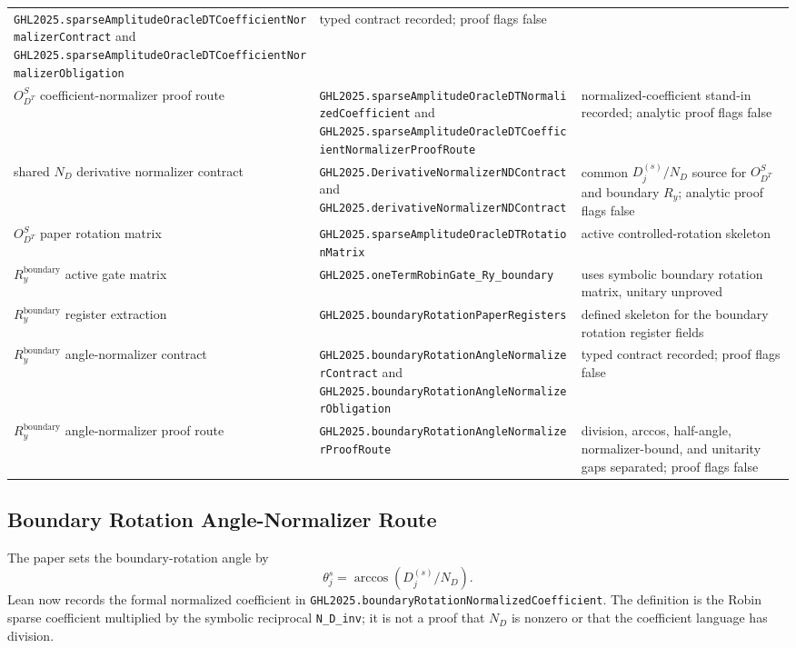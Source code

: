 \begin{center}
\begin{tabular}{lll}
\texttt{GHL2025.sparseAmplitudeOracleDTCoefficientNormalizerContract} and
\texttt{GHL2025.sparseAmplitudeOracleDTCoefficientNormalizerObligation} &
typed contract recorded; proof flags false \\
\(O_{D^T}^S\) coefficient-normalizer proof route &
\texttt{GHL2025.sparseAmplitudeOracleDTNormalizedCoefficient} and
\texttt{GHL2025.sparseAmplitudeOracleDTCoefficientNormalizerProofRoute} &
normalized-coefficient stand-in recorded; analytic proof flags false \\
shared \(N_D\) derivative normalizer contract &
\texttt{GHL2025.DerivativeNormalizerNDContract} and
\texttt{GHL2025.derivativeNormalizerNDContract} &
common \(D_j^{(s)}/N_D\) source for \(O_{D^T}^S\) and boundary \(R_y\);
analytic proof flags false \\
\(O_{D^T}^S\) paper rotation matrix &
\texttt{GHL2025.sparseAmplitudeOracleDTRotationMatrix} &
active controlled-rotation skeleton \\
\(R_y^{\mathrm{boundary}}\) active gate matrix &
\texttt{GHL2025.oneTermRobinGate\_Ry\_boundary} &
uses symbolic boundary rotation matrix, unitary unproved \\
\(R_y^{\mathrm{boundary}}\) register extraction &
\texttt{GHL2025.boundaryRotationPaperRegisters} &
defined skeleton for the boundary rotation register fields \\
\(R_y^{\mathrm{boundary}}\) angle-normalizer contract &
\texttt{GHL2025.boundaryRotationAngleNormalizerContract} and
\texttt{GHL2025.boundaryRotationAngleNormalizerObligation} &
typed contract recorded; proof flags false \\
\(R_y^{\mathrm{boundary}}\) angle-normalizer proof route &
\texttt{GHL2025.boundaryRotationAngleNormalizerProofRoute} &
division, arccos, half-angle, normalizer-bound, and unitarity gaps separated;
proof flags false \\
\hline
\end{tabular}
\end{center}

\subsection{Boundary Rotation Angle-Normalizer Route}

The paper sets the boundary-rotation angle by
\[
  \theta_j^s=\arccos\!\left(D_j^{(s)}/N_D\right).
\]
Lean now records the formal normalized coefficient in
\texttt{GHL2025.boundaryRotationNormalizedCoefficient}.  The definition is the
Robin sparse coefficient multiplied by the symbolic reciprocal
\texttt{N\_D\_inv}; it is not a proof that \(N_D\) is nonzero or that the
coefficient language has division.

